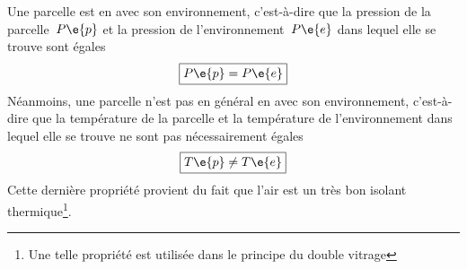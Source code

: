 \sk
Une parcelle est en  avec son environnement, c'est-à-dire que la pression de la parcelle~$P\e{p}$ et la pression de l'environnement~$P\e{e}$ dans lequel elle se trouve sont égales
\[ \boxed{P\e{p} = P\e{e}} \]
Néanmoins, une parcelle n'est pas en général en  avec son environnement, c'est-à-dire que la température de la parcelle et la température de l'environnement dans lequel elle se trouve ne sont pas nécessairement égales
\[ \boxed{T\e{p} \neq T\e{e}} \]
Cette dernière propriété provient du fait que l'air est un très bon isolant thermique\footnote{Une telle propriété est utilisée dans le principe du double vitrage}.


